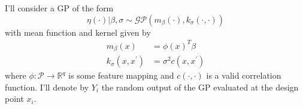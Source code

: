 \documentclass[12pt]{article}
\newcommand{\R}{\mathcal{R}}
\def\R{\mathbb{R}}
\begin{document}
I'll consider a GP of the form 
\[\eta(\cdot)|\beta, \sigma \sim \mathcal{GP}(m_\beta(\cdot), k_\sigma(\cdot, \cdot))\]
with mean function and kernel given by 
\begin{align*}
m_\beta(x) &= \phi(x)^T \beta \\
k_{\sigma}(x, x^\prime) &= \sigma^2 c(x, x^\prime)
\end{align*}
where $\phi: \mathcal{P} \to \R^q$ is some feature mapping and $c(\cdot, \cdot)$ is a valid correlation function. I'll denote by $Y_i$ the random output of the GP evaluated at the design point $x_i$. 
\end{document}

